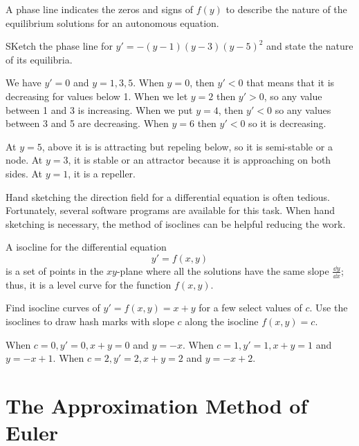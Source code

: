\documentclass[../diffeq.tex]{subfiles}
\begin{document}
A phase line indicates the zeros and signs of $f(y)$ to describe the nature of the equilibrium solutions for an autonomous equation.

\begin{example}
    SKetch the phase line for $y'=-(y-1)(y-3)(y-5)^2$ and state the nature of its equilibria.

    We have $y'=0$ and $y=1,3,5$. When $y=0$, then $y'<0$ that means that it is decreasing for values below 1. When we let $y=2$ then $y'>0$, so any value between 1 and 3 is increasing. When we put $y=4$, then $y'<0$ so any values between 3 and 5 are decreasing.
    When $y=6$ then $y'<0$ so it is decreasing.

    At $y=5$, above it is is attracting but repeling below, so it is semi-stable or a node. At $y=3$, it is stable or an attractor because it is approaching on both sides. At $y=1$, it is a repeller. 
\end{example}

Hand sketching the direction field for a differential equation is often tedious. Fortunately, several software programs are available for this task. When hand sketching is necessary, the method of isoclines can be helpful reducing the work.

A isocline for the differential equation 
\[ y'=f(x,y) \]
is a set of points in the $xy$-plane where all the solutions have the same slope $\frac{\dd y}{\dd x}$; thus, it is a level curve for the function $f(x,y)$.

\begin{example}
    Find isocline curves of $y'=f(x,y) = x+y$ for a few select values of $c$. Use the isoclines to draw hash marks with slope $c$ along the isocline $f(x,y)=c$.

    When $c=0, y'=0, x+y=0$ and $y=-x$. When $c=1, y'=1,x+y=1$ and $y=-x+1$. When $c=2,y'=2,x+y=2$ and $y=-x+2$.
\end{example}

\section{The Approximation Method of Euler}
\end{document}
